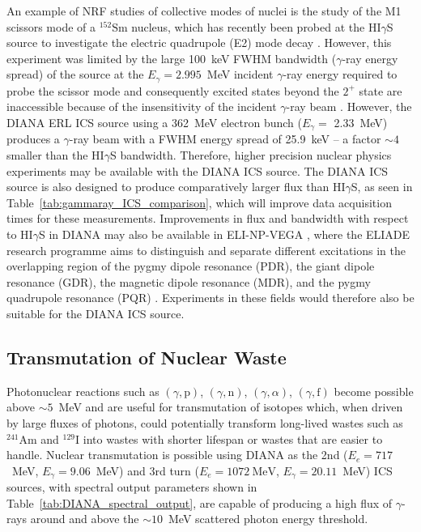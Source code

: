\documentclass[../main.tex]{subfiles}
\begin{document}
An example of NRF studies of collective modes of nuclei is the study of the M1 scissors mode of a $^{152}\textrm{Sm}$ nucleus, which has recently been probed at the HI$\gamma$S source to investigate the electric quadrupole (E2) mode decay \cite{ide20212}. However, this experiment was limited by the large 100~\si{\kilo\electronvolt} FWHM bandwidth ($\gamma$-ray energy spread) \cite{ide20212} of the source at the $E_{\gamma} = 2.995$~\si{\mega\electronvolt} incident $\gamma$-ray energy required to probe the scissor mode \cite{ziegler1993low} and consequently excited states beyond the $2^{+}$ state are inaccessible because of the insensitivity of the incident $\gamma$-ray beam \cite{ide20212}. However, the DIANA ERL ICS source using a 362~\si{\mega\electronvolt} electron bunch ($E_{\gamma} =$ 2.33~\si{\mega\electronvolt}) produces a $\gamma$-ray beam with a FWHM energy spread of 25.9~\si{\kilo\electronvolt} -- a factor $\sim4$ smaller than the HI$\gamma$S bandwidth. Therefore, higher precision nuclear physics experiments may be available with the DIANA ICS source. The DIANA ICS source is also designed to produce comparatively larger flux than HI$\gamma$S, as seen in Table~\ref{tab:gammaray_ICS_comparison}, which will improve data acquisition times for these measurements. Improvements in flux and bandwidth with respect to HI$\gamma$S \cite{weller2009research} in DIANA may also be available in ELI-NP-VEGA \cite{elinp2019vega}, where the ELIADE research programme aims to distinguish and separate different excitations in the overlapping region of the pygmy dipole resonance (PDR), the giant dipole resonance (GDR), the magnetic dipole resonance (MDR), and the pygmy quadrupole resonance (PQR) \cite{tanaka2020current}. Experiments in these fields would therefore also be suitable for the DIANA ICS source.

\subsection{Transmutation of Nuclear Waste}

Photonuclear reactions such as $(\gamma,\mathrm{p})$, $(\gamma,\mathrm{n})$, $(\gamma,\alpha)$, $(\gamma,\mathrm{f})$ become possible above $\sim5$~\si{\mega\electronvolt} and are useful for transmutation of isotopes which, when driven by large fluxes of photons, could potentially transform long-lived wastes such as $^{241}\mathrm{Am}$ and $^{129}\mathrm{I}$ \cite{cho2016reconsideration} into wastes with shorter lifespan or wastes that are easier to handle. Nuclear transmutation is possible using DIANA as the 2nd ($E_{e}=717$~\si{\mega\electronvolt}, $E_{\gamma}=9.06$~\si{\mega\electronvolt}) and 3rd turn ($E_{e}=1072~\si{\mega\electronvolt}$, $E_{\gamma}=20.11$~\si{\mega\electronvolt}) ICS sources, with spectral output parameters shown in Table~\ref{tab:DIANA_spectral_output}, are capable of producing a high flux of $\gamma$-rays around and above the $\sim10$~\si{\mega\electronvolt} scattered photon energy threshold.
\end{document}
